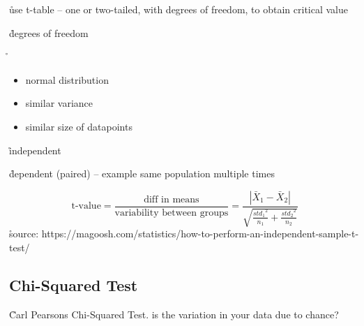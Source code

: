 \r{use t-table -- one or two-tailed, with degrees of freedom, to obtain critical value}

\r{degrees of freedom}

\r{\begin{itemize}[noitemsep,topsep=0pt]
		\item normal distribution
		\item similar variance
		\item similar size of datapoints
	\end{itemize}
}

\r{independent}

\r{dependent (paired) -- example same population multiple times}


\begin{equation}
	{\textrm{t-value} = \frac{ \textrm{diff in means}}{\textrm{variability between groups}} = \frac{ |\bar{X}_1 - \bar{X}_2|}{ 
			\sqrt{ \frac{ {std_1}^2 }{ n_1 } + \frac{ {std_2}^2 }{ n_2 }}}}
	\label{eq:paired_t_test}
\end{equation}
\r{source: https://magoosh.com/statistics/how-to-perform-an-independent-sample-t-test/}


\subsection{Chi-Squared Test}

\r{Carl Pearsons Chi-Squared Test. is the variation in your data due to chance?}